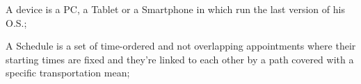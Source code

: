 %
\begin{definition} \label{def:device}
A device is a PC, a Tablet or a Smartphone in which run the last version of his O.S.;
\end{definition}

%
%
%
\begin{definition} \label{def:schedule}
A Schedule is a set of time-ordered and not overlapping appointments where their starting times are fixed and they're linked to each other by a path covered with a specific transportation mean;
\end{definition}


